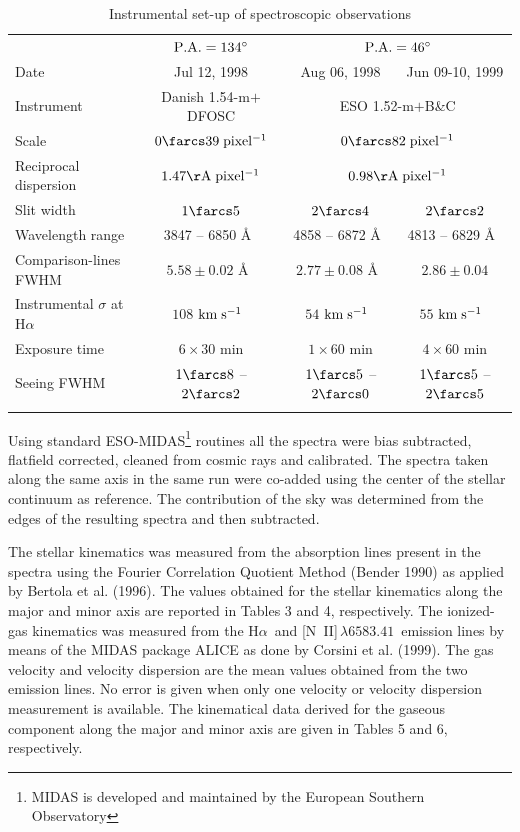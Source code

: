 \documentclass[twocolumns]{aa}
\def\kms{$\rm km\;s^{-1}$}
\def\dg{^\circ}
\def\ha{H$\alpha$}
\def\ng{[N~{\scriptsize II}]$\,\lambda6583.41$}
\begin{document}
\begin{table}[ht!]
\caption{Instrumental set-up of spectroscopic observations}
\begin{center}
\begin{tabular}{lccc}
\hline
\noalign{\smallskip} 
\multicolumn{1}{l}{Parameter} & 
\multicolumn{1}{c}{$\rm P.A.=134\dg$} & 
\multicolumn{2}{c}{$\rm P.A.=46\dg$} \\
\noalign{\smallskip} 
\hline
\noalign{\smallskip} 
Date                   & Jul 12, 1998  & Aug 06, 1998 & 
  Jun 09-10, 1999 \\ 
Instrument             & Danish 1.54-m$+$DFOSC        & 
  \multicolumn{2}{c}{ESO 1.52-m$+$B\&C} \\
Scale                  & $\rm 0\farcs39\;pixel^{-1}$ & 
  \multicolumn{2}{c}{$\rm 0\farcs82\;pixel^{-1}$} \\
Reciprocal dispersion  & $\rm 1.47 \AA\;pixel^{-1}$    & 
  \multicolumn{2}{c}{$\rm 0.98 \AA\;pixel^{-1}$} \\
Slit width             & $1\farcs5$  & $2\farcs4$ &
  $2\farcs2$ \\
Wavelength range       & 3847 -- 6850 \AA\        & 4858 -- 6872 \AA\ & 
   4813 -- 6829 \AA\  \\
Comparison-lines FWHM  & $5.58\pm0.02$ \AA\       & $2.77\pm0.08$ \AA\ & 
  $2.86\pm0.04$\\ 
Instrumental $\sigma$ at \ha\    & $108$ \kms\    & $54$ \kms\ & 
  $55$ \kms\   \\
Exposure time          & $6\times30$ min          &  $1\times60$ min &
  $4\times60$ min \\
Seeing FWHM            & $1\farcs8$ -- $2\farcs2$ & $1\farcs5$ -- $2\farcs0$ &
  $1\farcs5$ -- $2\farcs5$\\
\noalign{\smallskip} 
\hline
\end{tabular}
\end{center}
\label{tab:n4672_setup}
\end{table}


Using standard ESO-MIDAS\footnote{MIDAS is developed and maintained by
the European Southern Observatory} routines all the spectra were bias
subtracted, flatfield corrected, cleaned from cosmic rays and
calibrated. The spectra taken along the same axis in the same run were
co-added using the center of the stellar continuum as reference. The
contribution of the sky was determined from the edges of the resulting
spectra and then subtracted.

The stellar kinematics was measured from the absorption lines present
in the spectra using the Fourier Correlation Quotient Method (Bender
1990) as applied by Bertola et al. (1996). The values obtained for the
stellar kinematics along the major and minor axis are reported in
Tables 3 and 4, respectively.
The ionized-gas kinematics was measured from the \ha\ and \ng\
emission lines by means of the MIDAS package ALICE as done by Corsini
et al. (1999). The gas velocity and velocity dispersion are the mean
values obtained from the two emission lines. No error is given when
only one velocity or velocity dispersion measurement is available. The
kinematical data derived for the gaseous component along the major and
minor axis are given in Tables 5 and 6, respectively.  
\end{document}
